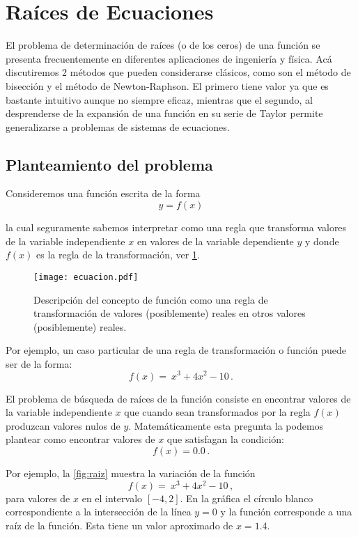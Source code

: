\section{Raíces de Ecuaciones}
El problema de determinación de raíces (o de los ceros) de una función se 
presenta frecuentemente en diferentes aplicaciones de ingeniería y física. Acá 
discutiremos 2 métodos que pueden considerarse clásicos, como son el método de 
bisección y el método de Newton-Raphson. El primero tiene valor ya que es 
bastante intuitivo aunque no siempre eficaz, mientras que el segundo, al 
desprenderse de la expansión de una función en su serie de Taylor permite 
generalizarse a problemas de sistemas de ecuaciones.

\subsection{Planteamiento del problema}

Consideremos una función escrita de la forma
\begin{equation}
y=f(x)
\label{funcionY}
\end{equation}

la cual seguramente sabemos interpretar como una regla que transforma valores
de la variable independiente $x$ en valores de la variable dependiente $y$ y
donde $f(x)$ es la regla de la transformación, ver \cref{fig:ecuacion}.

\begin{figure}[H]
	\centering
	\texttt{[image: ecuacion.pdf]}
	\caption{Descripción del concepto de función como una regla de
	transformación de valores (posiblemente) reales  en otros valores
	(posiblemente) reales.}
	\label{fig:ecuacion}
\end{figure}

Por ejemplo, un caso particular de una regla de transformación o función puede 
ser de la forma:
\[f(x) = \ x^3 + 4x^2 - 10\, .\]

El problema de búsqueda de raíces de la función consiste en encontrar valores 
de la variable independiente $x$ que cuando sean transformados por la regla 
$f(x)$ produzcan valores nulos de $y$. Matemáticamente esta pregunta la podemos 
plantear como encontrar valores de $x$ que satisfagan la condición:
\[f(x) = 0.0\, .\]

Por ejemplo, la \cref{fig:raiz} muestra la variación de la función
\[f(x) = \ x^3 + 4x^2 - 10\, ,\]
para valores de $x$ en el intervalo $[-4, 2].$ En la gráfica el círculo blanco 
correspondiente a la intersección de la línea $y=0$ y la función corresponde a 
una raíz de la función. Esta tiene un valor aproximado de $x=1.4.$

